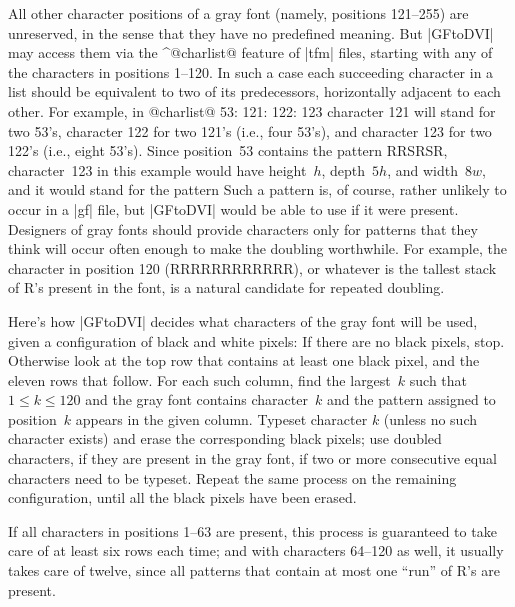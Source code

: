 All other character positions of a gray font (namely, positions 121--255)
are unreserved, in the sense that they have no predefined meaning.
But |GFtoDVI| may access them via the ^@charlist@ feature of
|tfm| files, starting with any of the characters in positions
1--120. In such a case each succeeding character in a list should be
equivalent to two of its predecessors, horizontally adjacent to each other.
For example, in
\begindisplay
@charlist@ 53: 121: 122: 123
\enddisplay
character 121 will stand for two 53's, character 122 for two 121's (i.e.,
four 53's), and character 123 for two 122's (i.e., eight 53's). Since
position~53 contains the pattern {\manual RRSRSR}, character~123 in this example
would have height~$h$, depth~$5h$, and width~$8w$, and it would stand for
the pattern
\begindisplay
\vbox{\offinterlineskip{}}
\enddisplay
Such a pattern is, of course, rather unlikely to occur in a |gf| file,
but |GFtoDVI| would be able to use if it were present. Designers
of gray fonts should provide characters only for patterns that they think
will occur often enough to make the doubling worthwhile. For example,
the character in position 120 ({\manual RRRRRRRRRRRR}), or whatever is the
tallest stack of\/ {\manual R}'s present in the font, is a natural candidate for
repeated doubling.

Here's how |GFtoDVI| decides what characters of the gray font will be used,
given a configuration of black and white pixels: If there are no black
pixels, stop. Otherwise look at the top row that contains at least one
black pixel, and the eleven rows that follow. For each such column,
find the largest~$k$ such that $1\leq k\leq120$ and the gray font contains
character~$k$ and the pattern assigned to position~$k$ appears in the
given column. Typeset character $k$ (unless no such character exists)
and erase the corresponding black pixels; use doubled characters,
if they are present in the gray font, if two or more consecutive equal
characters need to be typeset. Repeat the same process on the remaining
configuration, until all the black pixels have been erased.

If all characters in positions 1--63 are present, this process is guaranteed to
take care of at least six rows each time; and with characters 64--120 as well,
it usually takes care of twelve, since all patterns that contain at most
one ``run'' of\/ {\manual R}'s are present.

